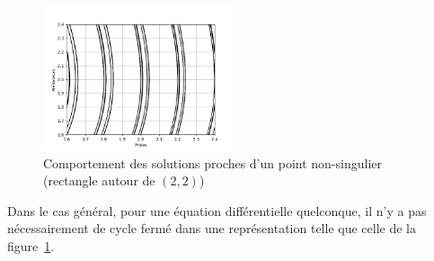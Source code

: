 \begin{figure}[htbp!]
	\centering
	\includegraphics[width=0.5\textwidth]{res/behaviour}
	\caption{Comportement des solutions proches d'un point non-singulier (rectangle autour de $(2, 2)$)}
	\label{fig:behaviour}
\end{figure}

Dans le cas général, pour une équation différentielle quelconque, il n'y a pas nécessairement de cycle fermé dans une représentation
telle que celle de la figure~\ref{fig:behaviour}.